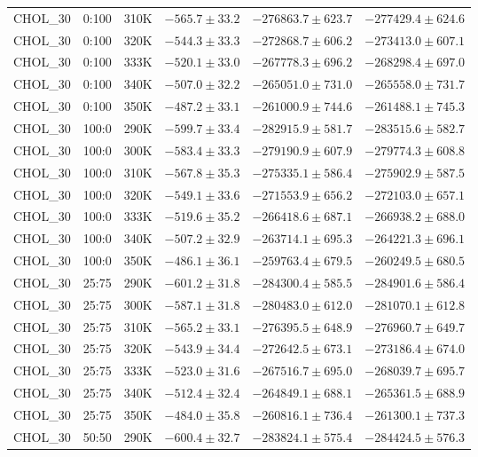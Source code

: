 \begin{longtable}{|c|c|c|c|c|c|}
CHOL\_30 & 0:100 & 310K & $-565.7 \pm 33.2$ & $-276863.7 \pm 623.7$ & $-277429.4 \pm 624.6$ \\
CHOL\_30 & 0:100 & 320K & $-544.3 \pm 33.3$ & $-272868.7 \pm 606.2$ & $-273413.0 \pm 607.1$ \\
CHOL\_30 & 0:100 & 333K & $-520.1 \pm 33.0$ & $-267778.3 \pm 696.2$ & $-268298.4 \pm 697.0$ \\
CHOL\_30 & 0:100 & 340K & $-507.0 \pm 32.2$ & $-265051.0 \pm 731.0$ & $-265558.0 \pm 731.7$ \\
CHOL\_30 & 0:100 & 350K & $-487.2 \pm 33.1$ & $-261000.9 \pm 744.6$ & $-261488.1 \pm 745.3$ \\
CHOL\_30 & 100:0 & 290K & $-599.7 \pm 33.4$ & $-282915.9 \pm 581.7$ & $-283515.6 \pm 582.7$ \\
CHOL\_30 & 100:0 & 300K & $-583.4 \pm 33.3$ & $-279190.9 \pm 607.9$ & $-279774.3 \pm 608.8$ \\
CHOL\_30 & 100:0 & 310K & $-567.8 \pm 35.3$ & $-275335.1 \pm 586.4$ & $-275902.9 \pm 587.5$ \\
CHOL\_30 & 100:0 & 320K & $-549.1 \pm 33.6$ & $-271553.9 \pm 656.2$ & $-272103.0 \pm 657.1$ \\
CHOL\_30 & 100:0 & 333K & $-519.6 \pm 35.2$ & $-266418.6 \pm 687.1$ & $-266938.2 \pm 688.0$ \\
CHOL\_30 & 100:0 & 340K & $-507.2 \pm 32.9$ & $-263714.1 \pm 695.3$ & $-264221.3 \pm 696.1$ \\
CHOL\_30 & 100:0 & 350K & $-486.1 \pm 36.1$ & $-259763.4 \pm 679.5$ & $-260249.5 \pm 680.5$ \\
CHOL\_30 & 25:75 & 290K & $-601.2 \pm 31.8$ & $-284300.4 \pm 585.5$ & $-284901.6 \pm 586.4$ \\
CHOL\_30 & 25:75 & 300K & $-587.1 \pm 31.8$ & $-280483.0 \pm 612.0$ & $-281070.1 \pm 612.8$ \\
CHOL\_30 & 25:75 & 310K & $-565.2 \pm 33.1$ & $-276395.5 \pm 648.9$ & $-276960.7 \pm 649.7$ \\
CHOL\_30 & 25:75 & 320K & $-543.9 \pm 34.4$ & $-272642.5 \pm 673.1$ & $-273186.4 \pm 674.0$ \\
CHOL\_30 & 25:75 & 333K & $-523.0 \pm 31.6$ & $-267516.7 \pm 695.0$ & $-268039.7 \pm 695.7$ \\
CHOL\_30 & 25:75 & 340K & $-512.4 \pm 32.4$ & $-264849.1 \pm 688.1$ & $-265361.5 \pm 688.9$ \\
CHOL\_30 & 25:75 & 350K & $-484.0 \pm 35.8$ & $-260816.1 \pm 736.4$ & $-261300.1 \pm 737.3$ \\
CHOL\_30 & 50:50 & 290K & $-600.4 \pm 32.7$ & $-283824.1 \pm 575.4$ & $-284424.5 \pm 576.3$ \\

\end{longtable}
